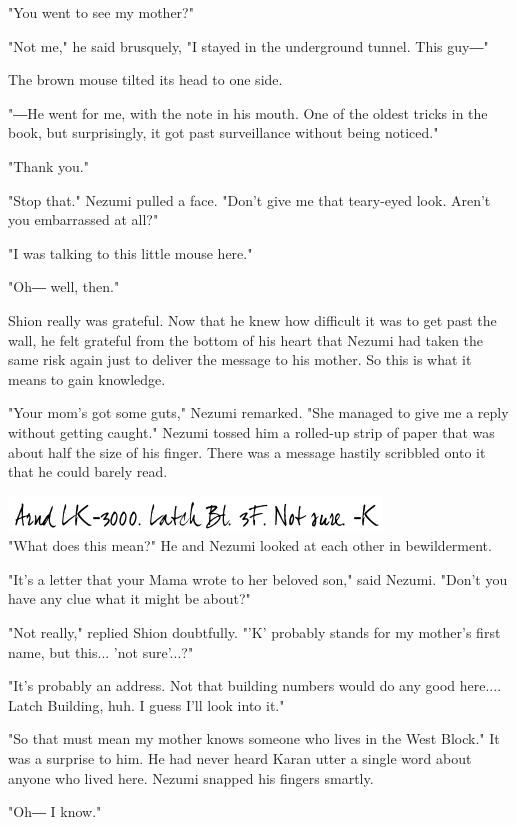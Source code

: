 "You went to see my mother?"

"Not me," he said brusquely, "I stayed in the underground tunnel. This
guy―"

The brown mouse tilted its head to one side.

"―He went for me, with the note in his mouth. One of the oldest tricks
in the book, but surprisingly, it got past surveillance without being
noticed."

"Thank you."

"Stop that." Nezumi pulled a face. "Don't give me that teary-eyed look.
Aren't you embarrassed at all?"

"I was talking to this little mouse here."

"Oh― well, then."

Shion really was grateful. Now that he knew how difficult it was to get
past the wall, he felt grateful from the bottom of his heart that Nezumi
had taken the same risk again just to deliver the message to his mother.
So this is what it means to gain knowledge.

"Your mom's got some guts," Nezumi remarked. "She managed to give me a
reply without getting caught." Nezumi tossed him a rolled-up strip of
paper that was about half the size of his finger. There was a message
hastily scribbled onto it that he could barely read.

\includegraphics{Images/memo1.png}\\

"What does this mean?" He and Nezumi looked at each other in
bewilderment.

"It's a letter that your Mama wrote to her beloved son," said Nezumi.
"Don't you have any clue what it might be about?"

"Not really," replied Shion doubtfully. "'K' probably stands for my
mother's first name, but this... 'not sure'...?"

"It's probably an address. Not that building numbers would do any good
here.... Latch Building, huh. I guess I'll look into it."

"So that must mean my mother knows someone who lives in the West Block."
It was a surprise to him. He had never heard Karan utter a single word
about anyone who lived here. Nezumi snapped his fingers smartly.

"Oh― I know."

